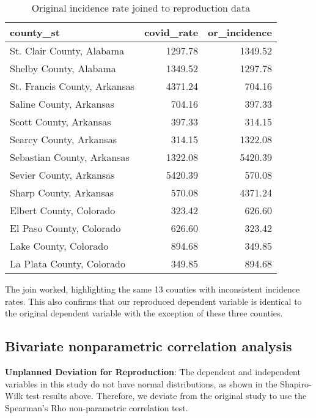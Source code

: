 \documentclass[
]{article}
\begin{document}
\begin{table}

\caption{\label{tab:join-incidence-rate}Original incidence rate joined to reproduction data}
\centering
\begin{tabular}[t]{l|r|r}
\hline
county\_st & covid\_rate & or\_incidence\\
\hline
St. Clair County, Alabama & 1297.78 & 1349.52\\
\hline
Shelby County, Alabama & 1349.52 & 1297.78\\
\hline
St. Francis County, Arkansas & 4371.24 & 704.16\\
\hline
Saline County, Arkansas & 704.16 & 397.33\\
\hline
Scott County, Arkansas & 397.33 & 314.15\\
\hline
Searcy County, Arkansas & 314.15 & 1322.08\\
\hline
Sebastian County, Arkansas & 1322.08 & 5420.39\\
\hline
Sevier County, Arkansas & 5420.39 & 570.08\\
\hline
Sharp County, Arkansas & 570.08 & 4371.24\\
\hline
Elbert County, Colorado & 323.42 & 626.60\\
\hline
El Paso County, Colorado & 626.60 & 323.42\\
\hline
Lake County, Colorado & 894.68 & 349.85\\
\hline
La Plata County, Colorado & 349.85 & 894.68\\
\hline
\end{tabular}
\end{table}

The join worked, highlighting the same 13 counties with inconsistent
incidence rates. This also confirms that our reproduced dependent
variable is identical to the original dependent variable with the
exception of these three counties.

\hypertarget{bivariate-nonparametric-correlation-analysis}{%
\subsection{Bivariate nonparametric correlation
analysis}\label{bivariate-nonparametric-correlation-analysis}}

\textbf{Unplanned Deviation for Reproduction}: The dependent and
independent variables in this study do not have normal distributions, as
shown in the Shapiro-Wilk test results above. Therefore, we deviate from
the original study to use the Spearman's Rho non-parametric correlation
test.
\end{document}
